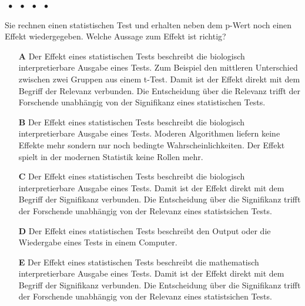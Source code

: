 \documentclass[a4paper, 9pt]{scrartcl}\usepackage[]{graphicx}\usepackage[]{xcolor}
\begin{document}
\ifcollection
\begin{flushright}
\tiny\vspace{-2Ex}
\textbf{\examinhaltstart}
\exammodulemathstat $\;\bullet$
\exammodulestat $\;\bullet$
\exammodulestatbbv $\;\bullet$
\exammodulestatversuch $\;\bullet$
\exammodulebiostat
\vspace{-1Ex}
\end{flushright}
\fi




Sie rechnen einen statistischen Test und erhalten neben dem p-Wert noch einen Effekt wiedergegeben. Welche Aussage zum Effekt ist richtig?



\begin{enumerate}
\item [\textbf{A} \msquare] Der Effekt eines statistischen Tests beschreibt die biologisch interpretierbare Ausgabe eines Tests. Zum Beispiel den mittleren Unterschied zwischen zwei Gruppen aus einem t-Test. Damit ist der Effekt direkt mit dem Begriff der Relevanz verbunden. Die Entscheidung über die Relevanz trifft der Forschende unabhängig von der Signifikanz eines statistischen Tests.
\item [\textbf{B} \msquare] Der Effekt eines statistischen Tests beschreibt die biologisch interpretierbare Ausgabe eines Tests. Moderen Algorithmen liefern keine Effekte mehr sondern nur noch bedingte Wahrscheinlichkeiten. Der Effekt spielt in der modernen Statistik keine Rollen mehr.
\item [\textbf{C} \msquare] Der Effekt eines statistischen Tests beschreibt die biologisch interpretierbare Ausgabe eines Tests. Damit ist der Effekt direkt mit dem Begriff der Signifikanz verbunden. Die Entscheidung über die Signifikanz trifft der Forschende unabhängig von der Relevanz eines statistsichen Tests.
\item [\textbf{D} \msquare] Der Effekt eines statistischen Tests beschreibt den Output oder die Wiedergabe eines Tests in einem Computer.
\item [\textbf{E} \msquare] Der Effekt eines statistischen Tests beschreibt die mathematisch interpretierbare Ausgabe eines Tests. Damit ist der Effekt direkt mit dem Begriff der Signifikanz verbunden. Die Entscheidung über die Signifikanz trifft der Forschende unabhängig von der Relevanz eines statistsichen Tests.
\end{enumerate}
\end{document}
